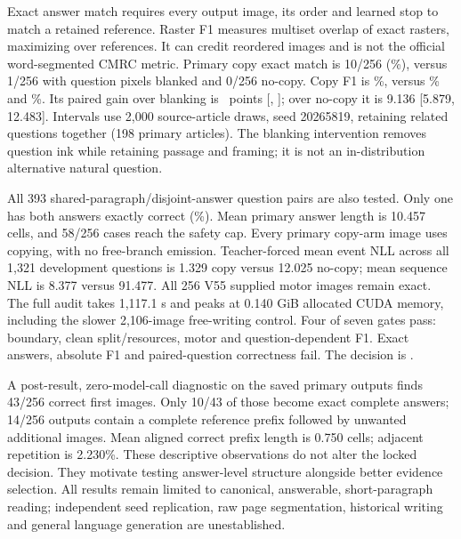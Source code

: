 \documentclass[10pt,a4paper]{article}
\begin{document}
Exact answer match requires every output image, its order and learned stop to
match a retained reference. Raster F1 measures multiset overlap of exact
rasters, maximizing over references. It can credit reordered images and is
not the official word-segmented CMRC metric. Primary copy exact match is
10/256 (\QaExact\%), versus 1/256 with question pixels blanked and 0/256 no-copy. Copy F1 is
\QaFone\%, versus \QaBlankFone\% and \QaControlFone\%. Its paired gain over
blanking is \QaQuestionGain\ points [\QaQuestionLow, \QaQuestionHigh]; over
no-copy it is 9.136 [5.879, 12.483]. Intervals use 2,000 source-article draws,
seed 20265819, retaining related questions together (198 primary articles).
The blanking intervention removes question ink while retaining passage and
framing; it is not an in-distribution alternative natural question.

All 393 shared-paragraph/disjoint-answer question pairs are also tested.
Only one has both answers exactly correct (\QaPairExact\%). Mean primary
answer length is 10.457 cells, and 58/256 cases reach the safety cap.
Every primary copy-arm image uses copying, with no free-branch emission.
Teacher-forced mean event NLL across all 1,321 development questions is
1.329 copy versus 12.025 no-copy; mean sequence NLL is 8.377 versus 91.477.
All 256 V55 supplied motor images remain exact. The full audit takes
1,117.1 s and peaks at 0.140 GiB allocated CUDA memory, including the slower
2,106-image free-writing control. Four of seven gates pass: boundary, clean
split/resources, motor and question-dependent F1. Exact answers, absolute F1
and paired-question correctness fail. The decision is \texttt{\QaDecision}.

A post-result, zero-model-call diagnostic on the saved primary outputs finds
43/256 correct first images. Only 10/43 of those become exact complete answers;
14/256 outputs contain a complete reference prefix followed by unwanted
additional images. Mean aligned correct prefix length is 0.750 cells; adjacent
repetition is 2.230\%. These descriptive observations do not alter the locked
decision. They motivate testing answer-level structure alongside better
evidence selection. All results remain limited to canonical, answerable,
short-paragraph reading; independent seed replication, raw page segmentation,
historical writing and general language generation are unestablished.
\end{document}
